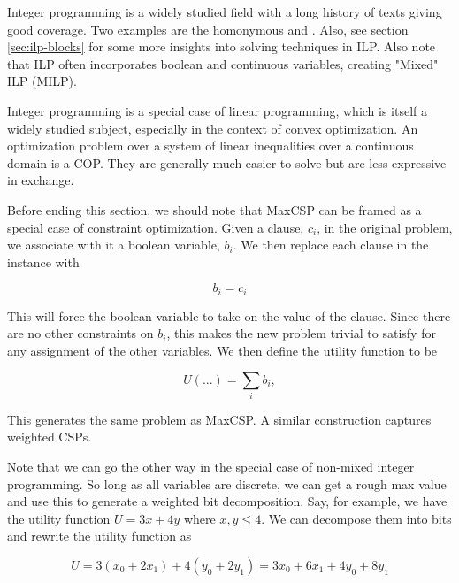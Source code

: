 Integer programming is a widely studied field with a long history of texts giving good coverage. Two examples are the homonymous  \citep{wolsey2020integer} and \citep{michelangelo2014integer}. Also, see section \ref{sec:ilp-blocks} for some more insights into solving techniques in ILP. Also note that ILP often incorporates boolean and continuous variables, creating "Mixed" ILP (MILP).

\begin{remark}
Integer programming is a special case of linear programming, which is itself a widely studied subject, especially in the context of convex optimization. An optimization problem over a system of linear inequalities over a continuous domain is a COP. They are generally much easier to solve but are less expressive in exchange.
\end{remark}

Before ending this section, we should note that MaxCSP can be framed as a special case of constraint optimization. Given a clause, $c_i$, in the original problem, we associate with it a boolean variable, $b_i$. We then replace each clause in the instance with

\begin{equation}
    b_i = c_i
\end{equation}

This will force the boolean variable to take on the value of the clause. Since there are no other constraints on $b_i$, this makes the new problem trivial to satisfy for any assignment of the other variables. We then define the utility function to be

\begin{equation}
    U(...) = \sum_i b_i,
\end{equation}

This generates the same problem as MaxCSP. A similar construction captures weighted CSPs.

Note that we can go the other way in the special case of non-mixed integer programming. So long as all variables are discrete, we can get a rough max value and use this to generate a weighted bit decomposition. Say, for example, we have the utility function $U = 3 x + 4 y$ where $x, y \leq 4$. We can decompose them into bits and rewrite the utility function as

\begin{equation}
    U = 3 (x_0 + 2 x_1) + 4 (y_0 + 2 y_1) = 3 x_0 + 6 x_1 + 4 y_0 + 8 y_1
\end{equation}

